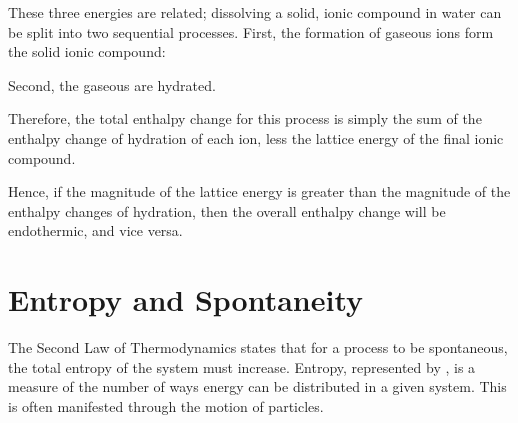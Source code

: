 				These three energies are related; dissolving a solid, ionic compound in water can be split into two sequential processes.
				First, the formation of gaseous ions form the solid ionic compound:


				Second, the gaseous are hydrated.


				Therefore, the total enthalpy change for this process is simply the sum of the enthalpy change of hydration of each ion, less
				the lattice energy of the final ionic compound.

				\mathdiagram{
					\[ \Delta H_{sol} = \sum{}\Delta H_{hyd} - LE \]
				}

				Hence, if the magnitude of the lattice energy is greater than the magnitude of the enthalpy changes of hydration, then the
				overall enthalpy change will be endothermic, and vice versa.





	\pagebreak
	\section{Entropy and Spontaneity}

		The Second Law of Thermodynamics states that for a process to be spontaneous, the total entropy of the system must increase. Entropy,
		represented by , is a measure of the number of ways energy can be distributed in a given system. This is often manifested through
		the motion of particles.

